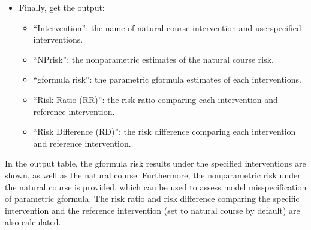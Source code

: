 \documentclass[letterpaper,10pt,english]{sphinxmanual}
\begin{document}
\begin{itemize}
\begin{sphinxVerbatim}[commandchars=\\\{\}]
\end{sphinxVerbatim}

\item {} 
\sphinxAtStartPar
Finally, get the output:

\begin{itemize}
\item {} 
\sphinxAtStartPar
“Intervention”: the name of natural course intervention and user\sphinxhyphen{}specified interventions.

\item {} 
\sphinxAtStartPar
“NP\sphinxhyphen{}risk”: the nonparametric estimates of the natural course risk.

\item {} 
\sphinxAtStartPar
“g\sphinxhyphen{}formula risk”: the parametric g\sphinxhyphen{}formula estimates of each interventions.

\item {} 
\sphinxAtStartPar
“Risk Ratio (RR)”: the risk ratio comparing each intervention and reference intervention.

\item {} 
\sphinxAtStartPar
“Risk Difference (RD)”: the risk difference comparing each intervention and reference intervention.

\end{itemize}

\end{itemize}

\sphinxAtStartPar
In the output table, the g\sphinxhyphen{}formula risk results under the specified interventions are shown, as well as the natural course.
Furthermore, the nonparametric risk under the natural course is provided, which can be used to assess model misspecification of parametric
g\sphinxhyphen{}formula. The risk ratio and risk difference comparing the specific intervention and the reference
intervention (set to natural course by default) are also calculated.
\end{document}
